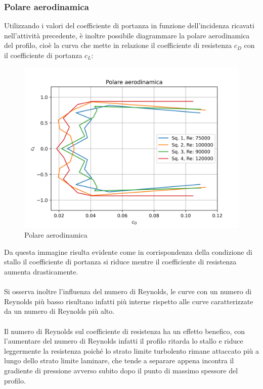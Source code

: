 \subsubsection{Polare aerodinamica}
\noindent Utilizzando i valori del coefficiente di portanza in funzione dell'incidenza ricavati nell'attività precedente, è inoltre possibile diagrammare la polare aerodinamica del profilo, cioè la curva che mette in relazione il coefficiente di resistenza $c_D$ con il coefficiente di portanza $c_L$:
\begin{figure}[H]
    \centering
    \includegraphics[width=.8\textwidth]{images/6/clvcd.png}
    \caption{Polare aerodinamica}
\end{figure}

\noindent Da questa immagine risulta evidente come in corrispondenza della condizione di stallo il coefficiente di portanza si riduce mentre il coefficiente di resistenza aumenta drasticamente.\\\\
Si osserva inoltre l'influenza del numero di Reynolds, le curve con un numero di Reynolds più basso risultano infatti più interne rispetto alle curve caratterizzate da un numero di Reynolds più alto.\\\\
Il numero di Reynolds sul coefficiente di resistenza ha un effetto benefico, con l'aumentare del numero di Reynolds infatti il profilo ritarda lo stallo e riduce leggermente la resistenza poiché lo strato limite turbolento rimane attaccato più a lungo dello strato limite laminare, che tende a separare appena incontra il gradiente di pressione avverso subito dopo il punto di massimo spessore del profilo.

\newpage
